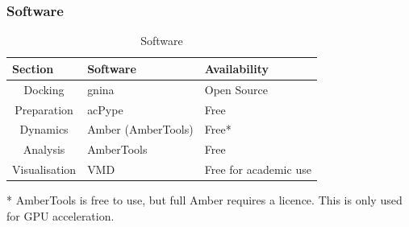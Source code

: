 \subsubsection{Software}
\begin{frame}
    \begin{table}[H]
    \centering
    \begin{tabular}{@{}cll@{}}
    \toprule
    \multicolumn{1}{l}{\textbf{Section}} & \textbf{Software}  & \textbf{Availability}   \\ \midrule
    Docking         & gnina            		& Open Source	        \\
    Preparation		& acPype				& Free					\\
    Dynamics        & Amber (AmberTools)    & Free*                 \\
    Analysis		& AmberTools			& Free					\\
    Visualisation   & VMD     				& Free for academic use \\
    \bottomrule
    \end{tabular}
    \label{Tab:software}
    \caption{Software}
    \end{table}
* AmberTools is free to use, but full Amber requires a licence. This is only used for GPU acceleration.
\end{frame}